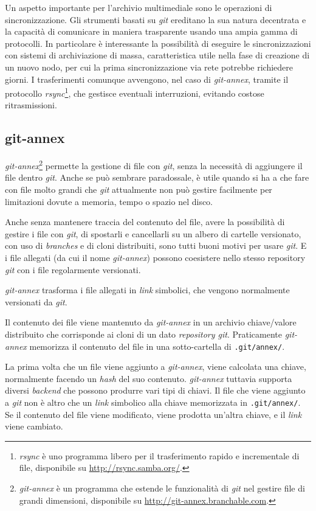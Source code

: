 Un aspetto importante per l'archivio multimediale sono le operazioni
di sincronizzazione. Gli strumenti basati su \emph{git} ereditano la
sua natura decentrata e la capacità di comunicare in maniera
trasparente usando una ampia gamma di protocolli. In particolare è
interessante la possibilità di eseguire le sincronizzazioni con
sistemi di archiviazione di massa, caratteristica utile nella fase di
creazione di un nuovo nodo, per cui la prima sincronizzazione via rete
potrebbe richiedere giorni. I trasferimenti comunque avvengono, nel
caso di \emph{git-annex}, tramite il protocollo
\emph{rsync}\footnote{\emph{rsync} è uno programma libero per il
  trasferimento rapido e incrementale di file, disponibile su
  \url{http://rsync.samba.org/}.}, che gestisce eventuali
interruzioni, evitando costose ritrasmissioni.

\subsection{git-annex}\label{git-annex}
\emph{git-annex}\footnote{\emph{git-annex} è un programma che estende
  le funzionalità di \emph{git} nel gestire file di grandi dimensioni,
  disponibile su \url{http://git-annex.branchable.com}.} permette la
gestione di file con \emph{git}, senza la necessità di aggiungere il
file dentro \emph{git}. Anche se può sembrare paradossale, è utile
quando si ha a che fare con file molto grandi che \emph{git}
attualmente non può gestire facilmente per limitazioni dovute a
memoria, tempo o spazio nel disco.

Anche senza mantenere traccia del contenuto del file, avere la 
possibilità di gestire i file con \emph{git}, di spostarli e cancellarli su un
albero di cartelle versionato, con uso di \emph{branches} e di cloni
distribuiti, sono tutti buoni motivi per usare \emph{git}. E i file allegati
(da cui il nome \emph{git-annex}) possono coesistere nello stesso repository
\emph{git} con i file regolarmente versionati.

\emph{git-annex} trasforma i file allegati in \emph{link}
simbolici, che vengono normalmente versionati da \emph{git}. 

Il contenuto dei file viene mantenuto da \emph{git-annex} in un
archivio chiave/valore distribuito che corrisponde ai cloni di un
dato \emph{repository git}. Praticamente \emph{git-annex} memorizza il
contenuto del file in una sotto-cartella di \verb|.git/annex/|.

La prima volta che un file viene aggiunto a \emph{git-annex}, viene
calcolata una chiave, normalmente facendo un \emph{hash} del suo
contenuto. \emph{git-annex} tuttavia supporta diversi \emph{backend}
che possono produrre vari tipi di chiavi. Il file che viene aggiunto a
\emph{git} non è altro che un \emph{link} simbolico alla chiave
memorizzata in \verb|.git/annex/|. Se il contenuto del file viene
modificato, viene prodotta un'altra chiave, e il \emph{link} viene
cambiato.

